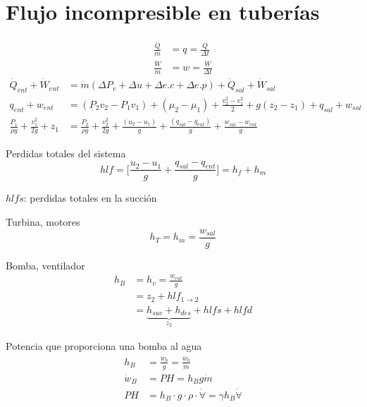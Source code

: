 \section{Flujo incompresible en tuberías}
\[
    \begin{split}
        \frac{ \dot{Q} }{ \dot{m} } & = q = \frac{ Q }{ \Delta t } \\
        \frac{ \dot{W} }{ \dot{m} } & = w = \frac{ W }{ \Delta t }
    \end{split}
\]
\[
    \begin{split}
        \dot{Q}_{ent} + \dot{W}_{ent} & = \dot{m} ( \Delta P_{v} + \Delta u + \Delta e.c + \Delta e.p) + \dot{Q}_{sal} + \dot{W}_{sal} \\
        q_{ent} + w_{ent} & = (P_{2}v_{2} - P_{1}v_{1}) + (\mu_{2} - \mu_{1}) + \frac{ v_{2}^{2} - v_{1}^{2} }{ 2 } + g(z_{2} - z_{1}) + q_{sal} + w_{sal} \\
        \frac{ P_{1} }{ \rho g } + \frac{ v_{1}^{2} }{ 2g } + z_{1} & = \frac{ P_{2} }{ \rho g } + \frac{ v_{2}^{2} }{ 2g } + \frac{ (u_{2} - u_{1}) }{ g } + \frac{ (q_{sal} - q_{ent}) }{ g } + \frac{ w_{sal} - w_{ent} }{ g }
    \end{split}
\]

Perdidas totales del sistema
\[
    hlf = \Big[ \frac{ u_{2} - u_{1} }{ g } + \frac{ q_{sal} - q_{ent} }{ g }\Big] = h_{f} + h_{m}
\]

\( hlfs \): perdidas totales en la succión 

Turbina, motores
\[
    h_{T} = h_{m} = \frac{ w_{sal} }{ g }
\]

Bomba, ventilador
\[
    \begin{split}
        h_{B} & = h_{v} = \frac{ w_{ent} }{ g } \\
        & = z_{2} + hlf_{1 \to 2} \\
        & = \underbrace{ h_{suc} + h_{des} }_{ z_{2} } + hlfs + hlfd
    \end{split}
\]

Potencia que proporciona una bomba al agua
\[
    \begin{split}
        h_{B} & = \frac{ w_{b} }{ g } = \frac{ \dot{w_{b}} }{ \dot{m} } \\
        \dot{w}_{B} & = PH = h_{B} g \dot{m} \\
        PH & = h_{B} \cdot g \cdot \rho \cdot \dot{ \forall } = \gamma h_{B} \dot{ \forall }
    \end{split}
\]